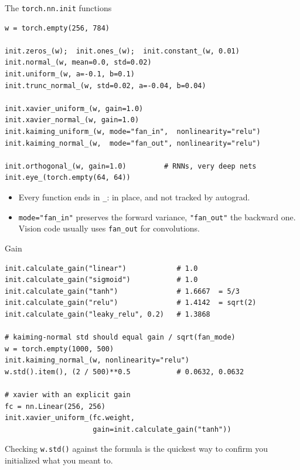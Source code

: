 \documentclass[10pt,aspectratio=169]{beamer}
\begin{document}
\begin{frame}[fragile]{The \texttt{torch.nn.init} functions}
\begin{lstlisting}
w = torch.empty(256, 784)

init.zeros_(w);  init.ones_(w);  init.constant_(w, 0.01)
init.normal_(w, mean=0.0, std=0.02)
init.uniform_(w, a=-0.1, b=0.1)
init.trunc_normal_(w, std=0.02, a=-0.04, b=0.04)

init.xavier_uniform_(w, gain=1.0)
init.xavier_normal_(w, gain=1.0)
init.kaiming_uniform_(w, mode="fan_in",  nonlinearity="relu")
init.kaiming_normal_(w,  mode="fan_out", nonlinearity="relu")

init.orthogonal_(w, gain=1.0)         # RNNs, very deep nets
init.eye_(torch.empty(64, 64))
\end{lstlisting}
\begin{itemize}
    \item Every function ends in \texttt{\_}: in place, and not tracked by autograd.
    \item \texttt{mode="fan\_in"} preserves the forward variance, \texttt{"fan\_out"} the backward one.
          Vision code usually uses \texttt{fan\_out} for convolutions.
\end{itemize}
\end{frame}

\begin{frame}[fragile]{Gain}
\begin{lstlisting}
init.calculate_gain("linear")            # 1.0
init.calculate_gain("sigmoid")           # 1.0
init.calculate_gain("tanh")              # 1.6667  = 5/3
init.calculate_gain("relu")              # 1.4142  = sqrt(2)
init.calculate_gain("leaky_relu", 0.2)   # 1.3868

# kaiming-normal std should equal gain / sqrt(fan_mode)
w = torch.empty(1000, 500)
init.kaiming_normal_(w, nonlinearity="relu")
w.std().item(), (2 / 500)**0.5           # 0.0632, 0.0632

# xavier with an explicit gain
fc = nn.Linear(256, 256)
init.xavier_uniform_(fc.weight,
                     gain=init.calculate_gain("tanh"))
\end{lstlisting}
Checking \texttt{w.std()} against the formula is the quickest way to confirm you initialized what
you meant to.
\end{frame}
\end{document}
